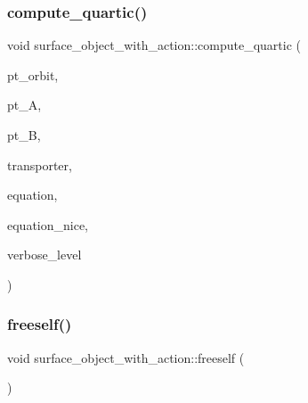 \mbox{\label{classsurface__object__with__action_a81b56bce88b110aa6b38cfd4dce46122}} 
\subsubsection{\texorpdfstring{compute\+\_\+quartic()}{compute\_quartic()}}
{\footnotesize\ttfamily void surface\+\_\+object\+\_\+with\+\_\+action\+::compute\+\_\+quartic (\begin{DoxyParamCaption}\item[{\mbox{\hyperlink{galois_8h_a09fddde158a3a20bd2dcadb609de11dc}{I\+NT}}}]{pt\+\_\+orbit,  }\item[{\mbox{\hyperlink{galois_8h_a09fddde158a3a20bd2dcadb609de11dc}{I\+NT}} \&}]{pt\+\_\+A,  }\item[{\mbox{\hyperlink{galois_8h_a09fddde158a3a20bd2dcadb609de11dc}{I\+NT}} \&}]{pt\+\_\+B,  }\item[{\mbox{\hyperlink{galois_8h_a09fddde158a3a20bd2dcadb609de11dc}{I\+NT}} $\ast$}]{transporter,  }\item[{\mbox{\hyperlink{galois_8h_a09fddde158a3a20bd2dcadb609de11dc}{I\+NT}} $\ast$}]{equation,  }\item[{\mbox{\hyperlink{galois_8h_a09fddde158a3a20bd2dcadb609de11dc}{I\+NT}} $\ast$}]{equation\+\_\+nice,  }\item[{\mbox{\hyperlink{galois_8h_a09fddde158a3a20bd2dcadb609de11dc}{I\+NT}}}]{verbose\+\_\+level }\end{DoxyParamCaption})}

\mbox{\label{classsurface__object__with__action_a736510cad6c3cd2dd2f554bcf05d5293}} 
\subsubsection{\texorpdfstring{freeself()}{freeself()}}
{\footnotesize\ttfamily void surface\+\_\+object\+\_\+with\+\_\+action\+::freeself (\begin{DoxyParamCaption}{ }\end{DoxyParamCaption})}

